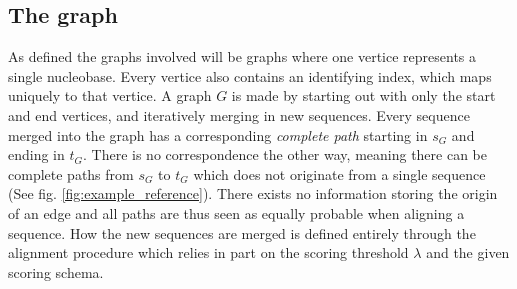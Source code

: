 \documentclass{article}
\begin{document}
\subsection{The graph}
As defined the graphs involved will be graphs where one vertice represents a single nucleobase. Every vertice also contains an identifying index, which maps uniquely to that vertice.  A graph $G$ is made by starting out with only the start and end vertices, and iteratively merging in new sequences. Every sequence merged into the graph has a corresponding \textit{complete path} starting in $s_G$ and ending in $t_G$. There is no correspondence the other way, meaning there can be complete paths from $s_G$ to $t_G$ which does not originate from a single sequence (See fig. \ref{fig:example_reference}). There exists no information storing the origin of an edge and all paths are thus seen as equally probable when aligning a sequence. How the new sequences are merged is defined entirely through the alignment procedure which relies in part on the scoring threshold $\lambda$ and the given scoring schema.
\clearpage
\end{document}
